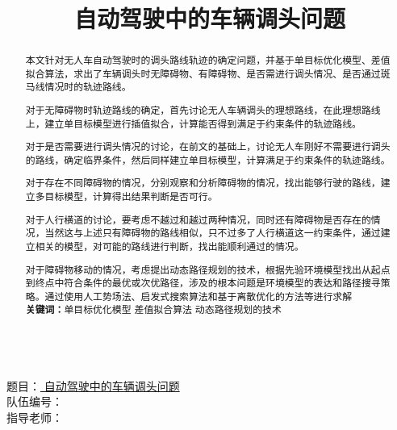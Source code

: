 \documentclass{article}
\title{\zihao{-2}自动驾驶中的车辆调头问题\vspace{-2em}}
\date{}     %
\author{}   %
\begin{document}
\setlength{\parindent}{2em}

\newpage
{                                                  %
    \qquad
    \\[10ex]
    题目：\underline{\hspace{0.6em} 自动驾驶中的车辆调头问题 \hspace{0.6em}}
    \\[10ex]
    队伍编号：\underline{\qquad {} \quad \qquad}
    \\[10ex]
    指导老师：\underline{\qquad \qquad \qquad \qquad \qquad \qquad }
}
\thispagestyle{empty}                                       %

\maketitle                                                  %
\thispagestyle{empty}                                       %
\begin{abstract}                                            %
    {                                                 %
        本文针对无人车自动驾驶时的调头路线轨迹的确定问题，并基于单目标优化模型、差值拟合算法，求出了车辆调头时无障碍物、有障碍物、是否需进行调头情况、是否通过斑马线情况时的轨迹路线。

        对于无障碍物时轨迹路线的确定，首先讨论无人车辆调头的理想路线，在此理想路线上，建立单目标模型进行插值拟合，计算能否得到满足于约束条件的轨迹路线。

        对于是否需要进行调头情况的讨论，在前文的基础上，讨论无人车刚好不需要进行调头的路线，确定临界条件，然后同样建立单目标模型，计算满足于约束条件的轨迹路线。

        对于存在不同障碍物的情况，分别观察和分析障碍物的情况，找出能够行驶的路线，建立多目标模型，计算得出结果判断是否可行。

        对于人行横道的讨论，要考虑不越过和越过两种情况，同时还有障碍物是否存在的情况，当然这与上述只有障碍物的路线相似，只不过多了人行横道这一约束条件，通过建立相关的模型，对可能的路线进行判断，找出能顺利通过的情况。

        对于障碍物移动的情况，考虑提出动态路径规划的技术，根据先验环境模型找出从起点到终点中符合条件的最优或次优路径，涉及的根本问题是环境模型的表达和路径搜寻策略。通过使用人工势场法、启发式搜索算法和基于离散优化的方法等进行求解\\

        \noindent \textbf{关键词：}单目标优化模型 \quad 差值拟合算法 \quad 动态路径规划的技术
    }
    \thispagestyle{empty}
\end{abstract}                                              %
\newpage                                                    %
\setcounter{page}{1}                                        %
\end{document}
